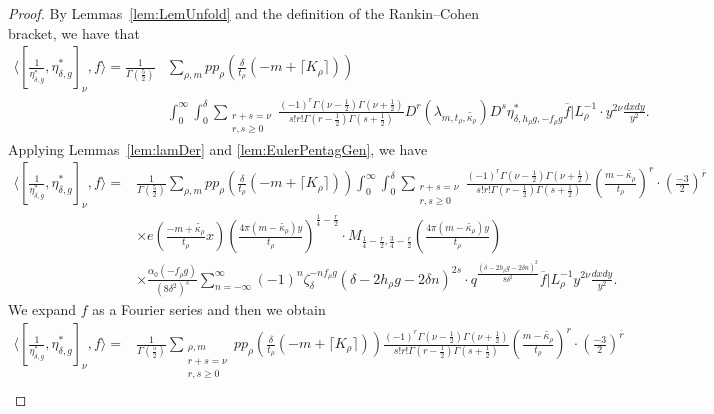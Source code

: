 \documentclass[10pt]{amsart}
\theoremstyle{definition}
\theoremstyle{remark}
\numberwithin{equation}{section}
\newcommand{\lam}{\lambda}
\begin{document}
	\begin{proof}
		By Lemmas~\ref{lem:LemUnfold} and the definition of the Rankin--Cohen bracket, we have that
		\begin{align*}
		\langle[\frac{1}{\eta_{\delta,g}^\ast},\eta_{\delta,g}^\ast]_\nu,f\rangle = \frac{1}{\Gamma(\frac{5}{2})}&
		\sum\limits_{\rho,m}pp_\rho\left(\frac{\delta}{t_\rho}(-m+\lceil K_\rho\rceil)\right)\\
		&\int_0^\infty\int_0^\delta \sum\limits_{\substack{r+s =\nu \\ r,s\geq 0}}\frac{(-1)^r\Gamma(\nu-\frac{1}{2})\Gamma(\nu+\frac{1}{2})}{s!r!\Gamma(r-\frac{1}{2})\Gamma({ s}+\frac{1}{2})} D^r(\lam_{m,t_\rho,\widetilde{\kappa_\rho}})D^s\eta_{\delta,h_\rho g,-f_\rho g}^\ast \overline{f}|L_\rho^{-1}\cdot y^{2\nu}\frac{dxdy}{y^2}.
		\end{align*}
		Applying Lemmas~\ref{lem:lamDer} and \ref{lem:EulerPentagGen}, we have
		\begin{align*}
			\langle[\frac{1}{\eta_{\delta,g}^\ast},\eta_{\delta,g}^\ast]_\nu,f\rangle = &\frac{1}{\Gamma(\frac{5}{2})}\sum\limits_{\rho,m}pp_\rho\left(\frac{\delta}{t_\rho}(-m+\lceil K_\rho\rceil)\right) \int_0^\infty\int_0^\delta\sum\limits_{\substack{r+s =\nu \\ r,s\geq 0}}\frac{(-1)^r\Gamma(\nu-\frac{1}{2})\Gamma(\nu+\frac{1}{2})}{s!r!\Gamma(r-\frac{1}{2})\Gamma({ s}+\frac{1}{2})} \left(\frac{m-\widetilde{\kappa_\rho}}{t_\rho}\right)^r\cdot\left(\frac{-3}{2}\right)^{\overline{r}} \\
			&\times e\left(\frac{-m+\widetilde{\kappa_\rho}}{t_\rho}x\right)\left(\frac{4\pi(m-\widetilde{\kappa_\rho})y}{t_\rho}\right)^{\frac{1}{4}-\frac{r}{2}}\cdot M_{\frac{1}{4}-\frac{r}{2},\frac{3}{4}-\frac{r}{2}}\left(\frac{4\pi(m-\widetilde{\kappa_\rho})y}{t_\rho}\right) \\
			&\times\frac{\alpha_0(-f_\rho g)}{(8\delta^2)^s}\sum\limits_{n=-\infty}^{\infty}(-1)^n\zeta_{\delta}^{-nf_\rho g}(\delta-2h_\rho g-2\delta n)^{2s}\cdot q^{\frac{(\delta-2h_\rho g-2\delta n)^2}{8\delta^2}}\overline{f}|L_\rho^{-1} y^{2\nu}\frac{dxdy}{y^2}.
		\end{align*}
		We expand $f$ as a Fourier series and then we obtain
		\begin{align*}
			\langle[\frac{1}{\eta_{\delta,g}^\ast},\eta_{\delta,g}^\ast]_\nu,f\rangle =
			& \frac{1}{\Gamma\left(\frac{5}{2}\right)}\sum\limits_{\substack{\rho,m \\ r+s=\nu \\ r,s\geq 0}}pp_\rho\left(\frac{\delta}{t_\rho}(-m+\lceil K_\rho\rceil)\right) \frac{(-1)^r\Gamma(\nu-\frac{1}{2})\Gamma(\nu+\frac{1}{2})}{s!r!\Gamma(r-\frac{1}{2})\Gamma({ s}+\frac{1}{2})} \left(\frac{m-\widetilde{\kappa_\rho}}{t_\rho}\right)^r\cdot\left(\frac{-3}{2}\right)^{\overline{r}} \\

\end{align*}
\end{proof}
\end{document}
